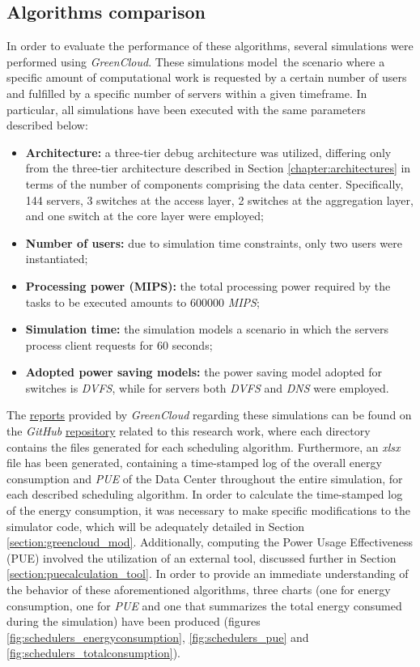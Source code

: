 \subsection{Algorithms comparison}
In order to evaluate the performance of these algorithms, several simulations were performed using \emph{GreenCloud}. These simulations model\ the scenario where a specific amount of computational work is requested by a certain number of users and fulfilled by a specific number of servers within a given timeframe. In particular, all simulations have been executed with the same parameters described below:
\begin{itemize}
    \item \textbf{Architecture:} a three-tier debug architecture was utilized, differing only from the three-tier architecture described in Section \ref{chapter:architectures} in terms of the number of components comprising the data center. Specifically, 144 servers, 3 switches at the access layer, 2 switches at the aggregation layer, and one switch at the core layer were employed;
    \item \textbf{Number of users:} due to simulation time constraints, only two users were instantiated;
    \item \textbf{Processing power (MIPS):} the total processing power required by the tasks to be executed amounts to 600000 \emph{MIPS};
    \item \textbf{Simulation time:} the simulation models a scenario in which the servers process client requests for 60 seconds;
    \item \textbf{Adopted power saving models:} the power saving model adopted for switches is \emph{DVFS}, while for servers both \emph{DVFS} and \emph{DNS} were employed.
\end{itemize}
The \href{https://github.com/vincenzo-emanuele/masters-degree-thesis/tree/main/scheduling\_algorithms\_comparison/simulations}{reports} provided by \emph{GreenCloud} regarding these simulations can be found on the \emph{GitHub} \href{https://github.com/vincenzo-emanuele/masters-degree-thesis}{repository} related to this research work, where each directory contains the files generated for each scheduling algorithm. Furthermore, an \emph{xlsx} file has been generated, containing a time-stamped log of the overall energy consumption and \emph{PUE} of the Data Center throughout the entire simulation, for each described scheduling algorithm. In order to calculate the time-stamped log of the energy consumption, it was necessary to make specific modifications to the simulator code, which will be adequately detailed in Section \ref{section:greencloud_mod}. Additionally, computing the Power Usage Effectiveness (PUE) involved the utilization of an external tool, discussed further in Section \ref{section:puecalculation_tool}. In order to provide an immediate understanding of the behavior of these aforementioned algorithms, three charts (one for energy consumption, one for \emph{PUE} and one that summarizes the total energy consumed during the simulation) have been produced (figures \ref{fig:schedulers_energyconsumption}, \ref{fig:schedulers_pue} and \ref{fig:schedulers_totalconsumption}). \\

